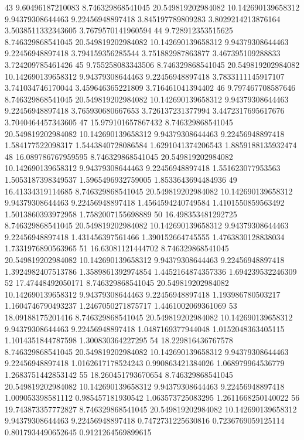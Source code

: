 {43 9.60496187210083 8.746329868541045 20.549819202984082 10.142690139658312 9.94379308644463 9.22456948897418 3.845197789809283 3.8029214213876164 3.5038511332343605 3.7679570141960594
44 9.728912353515625 8.746329868541045 20.549819202984082 10.142690139658312 9.94379308644463 9.22456948897418 3.794159356285544 3.751882987863877 3.467395109288833 3.724209785461426
45 9.755258083343506 8.746329868541045 20.549819202984082 10.142690139658312 9.94379308644463 9.22456948897418 3.7833111145917107 3.741034746170044 3.459646365221809 3.716461041394402
46 9.797467708587646 8.746329868541045 20.549819202984082 10.142690139658312 9.94379308644463 9.22456948897418 3.765930680667653 3.726137231377994 3.4472317695617676 3.7040464457343605
47 15.979101657867432 8.746329868541045 20.549819202984082 10.142690139658312 9.94379308644463 9.22456948897418 1.584177522098317 1.5443840728086584 1.6291041374206543 1.8859188135932474
48 16.089786767959595 8.746329868541045 20.549819202984082 10.142690139658312 9.94379308644463 9.22456948897418 1.551623077953563 1.5053187398349537 1.5965496932759005 1.8533643694484936
49 16.41334319114685 8.746329868541045 20.549819202984082 10.142690139658312 9.94379308644463 9.22456948897418 1.4564594240749584 1.4101550859563492 1.5013860393972958 1.7582007155698889
50 16.498353481292725 8.746329868541045 20.549819202984082 10.142690139658312 9.94379308644463 9.22456948897418 1.431456397561466 1.390152664745555 1.4763830128838034 1.7331976890563965
51 16.63081121444702 8.746329868541045 20.549819202984082 10.142690139658312 9.94379308644463 9.22456948897418 1.3924982407513786 1.3589861392974854 1.4452164874357336 1.694239532246309
52 17.47448492050171 8.746329868541045 20.549819202984082 10.142690139658312 9.94379308644463 9.22456948897418 1.193986780503217 1.1604746790493237 1.2467050271875717 1.4461002069361069
53 18.09188175201416 8.746329868541045 20.549819202984082 10.142690139658312 9.94379308644463 9.22456948897418 1.0487169377944048 1.0152048363405115 1.1014351844787598 1.300830364227295
54 18.229816436767578 8.746329868541045 20.549819202984082 10.142690139658312 9.94379308644463 9.22456948897418 1.0162617178524243 0.990863421384026 1.068979964536779 1.2683751442853142
55 18.260451793670654 8.746329868541045 20.549819202984082 10.142690139658312 9.94379308644463 9.22456948897418 1.009053398581112 0.985457181930542 1.063573725083295 1.2611668250140022
56 19.743873357772827 8.746329868541045 20.549819202984082 10.142690139658312 9.94379308644463 9.22456948897418 0.7472731225630816 0.7236769059125114 0.8017934490652645 0.9121264569899615
}
